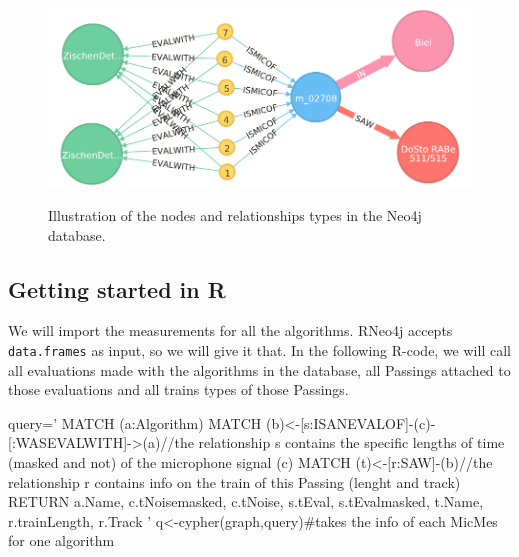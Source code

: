 \documentclass{article}\usepackage[]{graphicx}\usepackage[]{color}
\begin{document}
\begin{figure}
\centering
\includegraphics[width=\textwidth]{img/graph.pdf}
\label{graphneo4j}
\caption{Illustration of the nodes and relationships types in the Neo4j database.}
\end{figure}

\subsection{Getting started in R}

We will import the measurements for all the algorithms. RNeo4j accepts {\tt data.frames} as input, so we will give it that. In the following R-code, we will call all evaluations made with the algorithms in the database, all Passings attached to those evaluations and all trains types of those Passings.

\begin{Schunk}
\begin{Sinput}
query='
MATCH (a:Algorithm)
MATCH (b)<-[s:ISANEVALOF]-(c)-[:WASEVALWITH]->(a)//the relationship s contains the specific lengths of time (masked and not) of the microphone signal (c)
MATCH (t)<-[r:SAW]-(b)//the relationship r contains info on the train of this Passing (lenght and track)
RETURN a.Name, c.tNoisemasked, c.tNoise, s.tEval, s.tEvalmasked, t.Name, r.trainLength, r.Track
'
q<-cypher(graph,query)#takes the info of each MicMes for one algorithm
\end{Sinput}
\end{Schunk}
\end{document}
